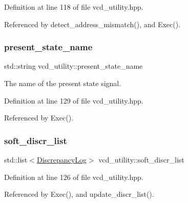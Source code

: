 Definition at line 118 of file vcd\+\_\+utility.\+hpp.



Referenced by detect\+\_\+address\+\_\+mismatch(), and Exec().

\mbox{\label{classvcd__utility_a40821ad341c215284ec3e7cdbeff0961}} 
\subsubsection{\texorpdfstring{present\+\_\+state\+\_\+name}{present\_state\_name}}
{\footnotesize\ttfamily std\+::string vcd\+\_\+utility\+::present\+\_\+state\+\_\+name\hspace{0.3cm}{\ttfamily [protected]}}



The name of the present state signal. 



Definition at line 129 of file vcd\+\_\+utility.\+hpp.



Referenced by Exec().

\mbox{\label{classvcd__utility_a524a718fb71b858a973a4c12527d09ae}} 
\subsubsection{\texorpdfstring{soft\+\_\+discr\+\_\+list}{soft\_discr\_list}}
{\footnotesize\ttfamily std\+::list$<$\hyperlink{structDiscrepancyLog}{Discrepancy\+Log}$>$ vcd\+\_\+utility\+::soft\+\_\+discr\+\_\+list\hspace{0.3cm}{\ttfamily [protected]}}



Definition at line 126 of file vcd\+\_\+utility.\+hpp.



Referenced by Exec(), and update\+\_\+discr\+\_\+list().

\mbox{\label{classvcd__utility_ada6cdc0efd5c0b4848cdf922330387a5}} 
